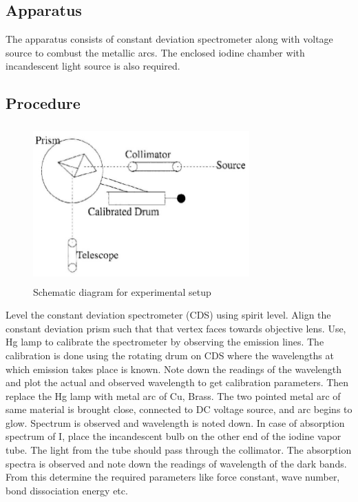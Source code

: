 \documentclass[a4paper, amsfonts, amssymb, amsmath, reprint, showkeys, nofootinbib, twoside]{revtex4-1}
\begin{document}
\subsection{Apparatus}
The apparatus consists of constant deviation spectrometer along with voltage source to combust the metallic arcs. The enclosed iodine chamber with incandescent light source is also required.
\subsection{Procedure}

\begin{figure}[H] %
	\centering
	\includegraphics[width=8.3cm,height=6cm]{5} 
	\caption{Schematic diagram for experimental setup}
	\label{5}
\end{figure}

Level the constant deviation spectrometer (CDS) using spirit level. Align the constant deviation prism such that that vertex faces towards objective lens. Use, Hg lamp to calibrate the spectrometer by observing the emission lines. The calibration is done using the rotating drum on CDS where the wavelengths at which emission takes place is known. Note down the readings of the wavelength and plot the actual and observed wavelength to get calibration parameters. Then replace the Hg lamp with metal arc of Cu, Brass. The two pointed metal arc of same material is brought close, connected to DC voltage source, and arc begins to glow. Spectrum is observed and wavelength is noted down. In case of absorption spectrum of I, place the incandescent bulb on the other end of the iodine vapor tube. The light from the tube should pass through the collimator. The absorption spectra is observed and note down the readings of wavelength of the dark bands. From this determine the required parameters like force constant, wave number, bond dissociation energy etc.
\end{document}
